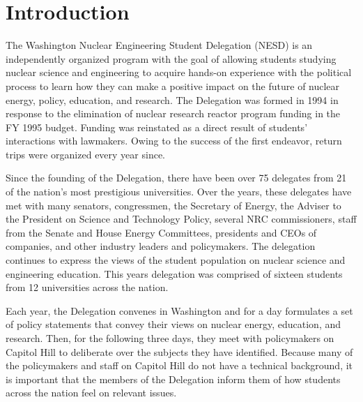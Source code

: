 \documentclass[12pt]{article}
\begin{document}


\newpage
\tableofcontents
\thispagestyle{empty}

\newpage
\setcounter{page}{1} 

\section{Introduction}

The Washington Nuclear Engineering Student Delegation (NESD) is an independently
organized program with the goal of allowing students studying nuclear science
and engineering to acquire hands-on experience with the political process to
learn how they can make a positive impact on the future of nuclear energy,
policy, education, and research. The Delegation was formed in 1994 in response
to the elimination of nuclear research reactor program funding in the FY 1995
budget. Funding was reinstated as a direct result of students' interactions with
lawmakers. Owing to the success of the first endeavor, return trips were
organized every year since.

Since the founding of the Delegation, there have been over 75 delegates from 21
of the nation's most prestigious universities. Over the years, these delegates
have met with many senators, congressmen, the Secretary of Energy, the Adviser
to the President on Science and Technology Policy, several NRC commissioners,
staff from the Senate and House Energy Committees, presidents and CEOs of
companies, and other industry leaders and policymakers. The delegation continues
to express the views of the student population on nuclear science and
engineering education. This years delegation was comprised of sixteen students
from 12 universities across the nation.

Each year, the Delegation convenes in Washington and for a day formulates a set
of policy statements that convey their views on nuclear energy, education, and
research. Then, for the following three days, they meet with policymakers on
Capitol Hill to deliberate over the subjects they have identified. Because many
of the policymakers and staff on Capitol Hill do not have a technical
background, it is important that the members of the Delegation inform them of
how students across the nation feel on relevant issues.
\end{document}
